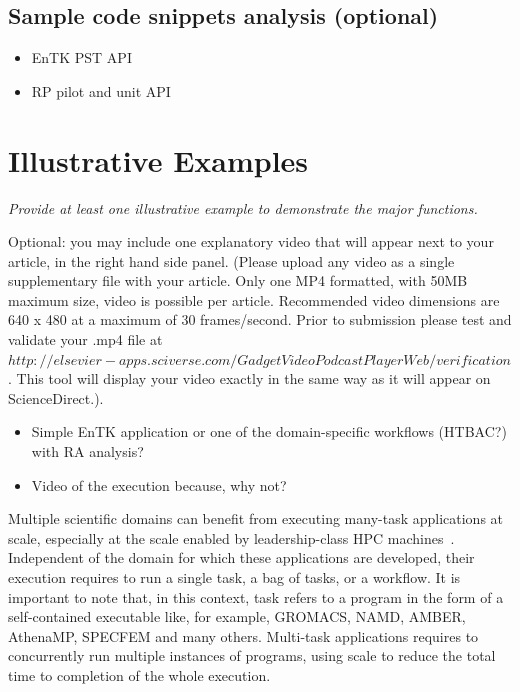\documentclass[preprint,12pt, a4paper]{elsarticle}
\begin{document}
\subsection{Sample code snippets analysis (optional)}\label{ssec:code}

\begin{itemize}
  \item EnTK PST API
  \item RP pilot and unit API
\end{itemize}

\section{Illustrative Examples}\label{sec:examples}

{\em Provide at least one illustrative example to demonstrate the major
functions.

Optional: you may include one explanatory video that will appear next to your
article, in the right hand side panel. (Please upload any video as a single
supplementary file with your article. Only one MP4 formatted, with 50MB
maximum size, video is possible per article. Recommended video dimensions are
640 x 480 at a maximum of 30 frames/second. Prior to submission please test
and validate your .mp4 file at $
http://elsevier-apps.sciverse.com/GadgetVideoPodcastPlayerWeb/verification$.
This tool will display your video exactly in the same way as it will appear
on ScienceDirect.).}

\begin{itemize}
  \item Simple EnTK application or one of the domain-specific workflows
  (HTBAC?) with RA analysis?
  \item Video of the execution because, why not?
\end{itemize}


Multiple scientific domains can benefit from executing many-task applications
at scale, especially at the scale enabled by leadership-class HPC
machines~\cite{many-task-apps}. Independent of the domain for which these
applications are developed, their execution requires to run a single task, a
bag of tasks, or a workflow. It is important to note that, in this context,
task refers to a program in the form of a self-contained executable like, for
example, GROMACS, NAMD, AMBER, AthenaMP, SPECFEM and many others. Multi-task
applications requires to concurrently run multiple instances of programs,
using scale to reduce the total time to completion of the whole execution.
\end{document}
